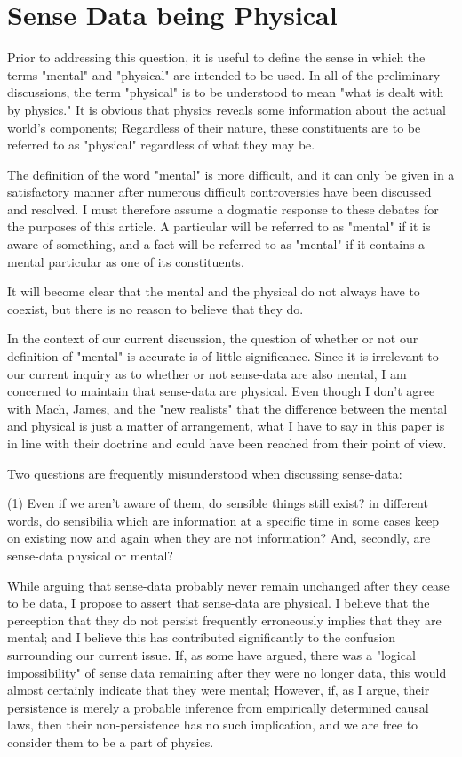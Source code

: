 \documentclass[a4paper,12pt]{book}[2004/02/16]
\theoremstyle{ilemma}
\theoremstyle{itheorem}
\theoremstyle{iother}
\theoremstyle{icorollary}
\theoremstyle{numcorollary}
\theoremstyle{idefinition}
\begin{document}
\section{Sense Data being Physical}
 Prior to addressing this question, it is useful to define the sense in which the terms "mental" and "physical" are intended to be used. In all of the preliminary discussions, the term "physical" is to be understood to mean "what is dealt with by physics." It is obvious that physics reveals some information about the actual world's components; Regardless of their nature, these constituents are to be referred to as "physical" regardless of what they may be.

The definition of the word "mental" is more difficult, and it can only be given in a satisfactory manner after numerous difficult controversies have been discussed and resolved. I must therefore assume a dogmatic response to these debates for the purposes of this article. A particular will be referred to as "mental" if it is aware of something, and a fact will be referred to as "mental" if it contains a mental particular as one of its constituents.

It will become clear that the mental and the physical do not always have to coexist, but there is no reason to believe that they do.

In the context of our current discussion, the question of whether or not our definition of "mental" is accurate is of little significance. Since it is irrelevant to our current inquiry as to whether or not sense-data are also mental, I am concerned to maintain that sense-data are physical. Even though I don't agree with Mach, James, and the "new realists" that the difference between the mental and physical is just a matter of arrangement, what I have to say in this paper is in line with their doctrine and could have been reached from their point of view.

Two questions are frequently misunderstood when discussing sense-data:

(1) Even if we aren't aware of them, do sensible things still exist? in
different words, do sensibilia which are information at a specific time
in some cases keep on existing now and again when they are not information? And, secondly, are sense-data physical or mental?

While arguing that sense-data probably never remain unchanged after they cease to be data, I propose to assert that sense-data are physical. I believe that the perception that they do not persist frequently erroneously implies that they are mental; and I believe this has contributed significantly to the confusion surrounding our current issue. If, as some have argued, there was a "logical impossibility" of sense data remaining after they were no longer data, this would almost certainly indicate that they were mental; However, if, as I argue, their persistence is merely a probable inference from empirically determined causal laws, then their non-persistence has no such implication, and we are free to consider them to be a part of physics.
\end{document}
